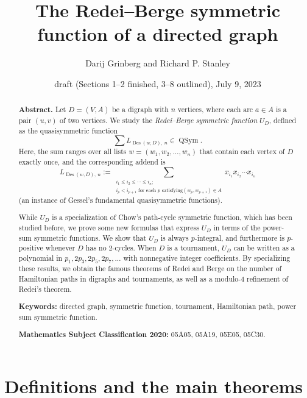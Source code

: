 \documentclass[numbers=enddot,12pt,final,onecolumn,notitlepage]{scrartcl}%
\numberwithin{exer}{section}
\theoremstyle{definition}
\let\sumnonlimits\sum
\renewcommand{\sum}{\sumnonlimits\limits}
\begin{document}
\title{The Redei--Berge symmetric function of a directed graph}
\author{Darij Grinberg and Richard P. Stanley}
\date{draft (Sections 1--2 finished, 3--8 outlined),
July 9, 2023}
\maketitle

\begin{abstract}
\textbf{Abstract.} Let $D=\left(  V,A\right)  $ be a digraph with $n$
vertices, where each arc $a\in A$ is a pair $\left(  u,v\right)  $ of two
vertices. We study the \emph{Redei--Berge symmetric function} $U_{D}$, defined
as the quasisymmetric function%
\[
\sum L_{\operatorname*{Des}\left(  w,D\right)  ,\ n}\in\operatorname*{QSym}.
\]
Here, the sum ranges over all lists $w=\left(  w_{1},w_{2},\ldots
,w_{n}\right)  $ that contain each vertex of $D$ exactly once, and the
corresponding addend is%
\[
L_{\operatorname*{Des}\left(  w,D\right)  ,\ n}:=\sum_{\substack{i_{1}\leq
i_{2}\leq\cdots\leq i_{n};\\i_{p}<i_{p+1}\text{ for each }p\text{ satisfying
}\left(  w_{p},w_{p+1}\right)  \in A}}x_{i_{1}}x_{i_{2}}\cdots x_{i_{n}}%
\]
(an instance of Gessel's fundamental quasisymmetric functions).

While $U_{D}$ is a specialization of Chow's path-cycle symmetric function,
which has been studied before, we prove some new formulas that express $U_{D}$
in terms of the power-sum symmetric functions. We show that $U_{D}$ is always
$p$-integral, and furthermore is $p$-positive whenever $D$ has no $2$-cycles.
When $D$ is a tournament, $U_{D}$ can be written as a polynomial in
$p_{1},2p_{3},2p_{5},2p_{7},\ldots$ with nonnegative integer coefficients. By
specializing these results, we obtain the famous theorems of Redei and Berge
on the number of Hamiltonian paths in digraphs and tournaments, as well as a
modulo-$4$ refinement of Redei's theorem. \medskip

\textbf{Keywords:} directed graph, symmetric function, tournament, Hamiltonian
path, power sum symmetric function.

\textbf{Mathematics Subject Classification 2020:} 05A05, 05A19, 05E05, 05C30.

\end{abstract}
\tableofcontents

\section{Definitions and the main theorems}
\end{document}
